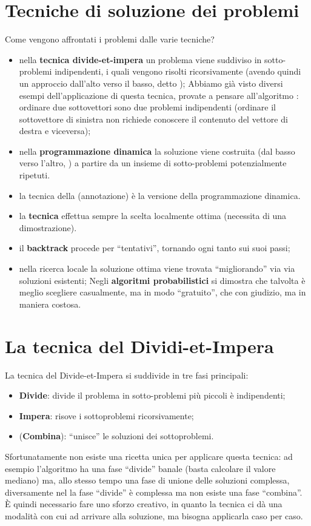 \section*{Tecniche di soluzione dei problemi}

Come vengono affrontati i problemi dalle varie tecniche?
\begin{itemize}
	\item nella \textbf{tecnica divide-et-impera} un problema viene suddiviso in sotto-problemi indipendenti, i quali vengono risolti ricorsivamente (avendo quindi un approccio dall'alto verso il basso, detto ); Abbiamo già visto diversi esempi dell'applicazione di questa tecnica, provate a pensare all'algoritmo \mergeSort: ordinare due sottovettori sono due problemi indipendenti (ordinare il sottovettore di sinistra non richiede conoscere il contenuto del vettore di destra e viceversa);
	\item nella \textbf{programmazione dinamica} la soluzione viene costruita (dal basso verso l'altro, ) a partire da un insieme di sotto-problemi potenzialmente ripetuti.
	\item la tecnica della  (annotazione) è la versione  della programmazione dinamica.
	\item la \textbf{tecnica } effettua sempre la scelta localmente ottima (necessita di una dimostrazione).
	\item il \textbf{backtrack} procede per \enquote{tentativi}, tornando ogni tanto sui suoi passi;
	\item nella ricerca locale la soluzione ottima viene trovata \enquote{migliorando} via via soluzioni esistenti; Negli \textbf{algoritmi probabilistici} si dimostra che talvolta è meglio scegliere casualmente, ma in modo \enquote{gratuito}, che con giudizio, ma in maniera costosa.
\end{itemize}

\section{La tecnica del Dividi-et-Impera}

La tecnica del Divide-et-Impera si suddivide in tre fasi principali:
\begin{itemize}
	\item \textbf{Divide}: divide il problema in sotto-problemi più piccoli è indipendenti;
	\item \textbf{Impera}: risove i sottoproblemi ricorsivamente;
	\item (\textbf{Combina}): \enquote{unisce} le soluzioni dei sottoproblemi.
\end{itemize}
Sfortunatamente non esiste una ricetta unica per applicare questa tecnica: ad esempio l'algoritmo \mergeSort ha una fase \enquote{divide} banale (basta calcolare il valore mediano) ma, allo stesso tempo una fase di unione delle soluzioni complessa, diversamente nel \quickSort la fase \enquote{divide} è complessa ma non esiste una fase \enquote{combina}.
\`{E} quindi necessario fare uno sforzo creativo, in quanto la tecnica ci dà una modalità con cui ad arrivare alla soluzione, ma bisogna applicarla caso per caso.

